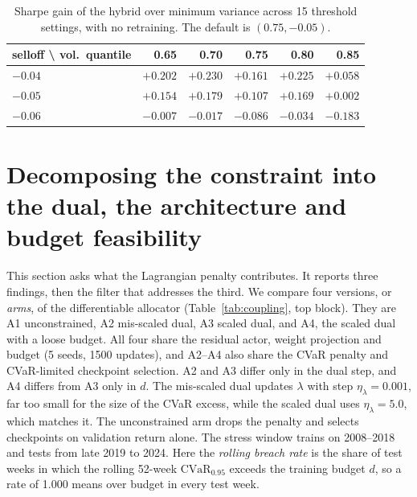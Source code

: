 \documentclass[sigconf]{acmart}
\begin{document}
\begin{table}[t]
\centering
\caption{Sharpe gain of the hybrid over minimum variance across 15 threshold settings, with no retraining. The default is $(0.75,-0.05)$.}
\label{tab:threshold}
\footnotesize
\setlength{\tabcolsep}{4pt}
\begin{tabular}{@{}lrrrrr@{}}
\toprule
selloff \textbackslash{} vol.\ quantile & 0.65 & 0.70 & 0.75 & 0.80 & 0.85 \\
\midrule
$-0.04$ & $+0.202$ & $+0.230$ & $+0.161$ & $+0.225$ & $+0.058$ \\
$-0.05$ & $+0.154$ & $+0.179$ & $+0.107$ & $+0.169$ & $+0.002$ \\
$-0.06$ & $-0.007$ & $-0.017$ & $-0.086$ & $-0.034$ & $-0.183$ \\
\bottomrule
\end{tabular}
\end{table}

\section{Decomposing the constraint into the dual, the architecture and budget feasibility}
\label{sec:coupling}

This section asks what the Lagrangian penalty contributes. It reports three findings, then the filter that addresses the third. We compare four versions, or
\emph{arms}, of the differentiable allocator (Table~\ref{tab:coupling}, top block). They are A1 unconstrained, A2 mis-scaled dual, A3 scaled dual, and A4, the scaled dual with a loose budget.
All four share the residual actor, weight projection and budget (5 seeds, 1500 updates), and A2--A4 also share the CVaR penalty and CVaR-limited checkpoint selection. A2 and A3 differ only in the
dual step, and A4 differs from A3 only in $d$. The mis-scaled dual updates $\lambda$ with step $\eta_\lambda=0.001$, far too small for the size of the CVaR excess, while the scaled dual uses $\eta_\lambda=5.0$, which matches it. The unconstrained
arm drops the penalty and selects checkpoints on validation return alone. The stress window
trains on 2008--2018 and tests from late 2019 to 2024. Here the \emph{rolling breach rate} is
the share of test weeks in which the rolling 52-week $\mathrm{CVaR}_{0.95}$ exceeds the training
budget $d$, so a rate of 1.000 means over budget in every test week.
\end{document}
